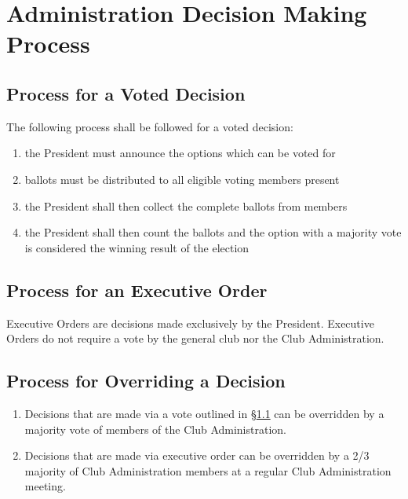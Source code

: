 \documentclass[english,11pt]{article}
\begin{document}
\section{Administration Decision Making Process} \label{art:decision-making}

\subsection{Process for a Voted Decision} \label{sect:decision-making:voted}
The following process shall be followed for a voted decision:

\begin{enumerate}[label=\alph*.]
    \item the President must announce the options which can be voted for
    \item ballots must be distributed to all eligible voting members present
    \item the President shall then collect the complete ballots from members
    \item the President shall then count the ballots and the option with a majority vote is considered the winning result of the election
\end{enumerate}

\subsection{Process for an Executive Order} \label{sect:decision-making:executive-order}
Executive Orders are decisions made exclusively by the President.
Executive Orders do not require a vote by the general club nor the Club Administration.

\subsection{Process for Overriding a Decision} \label{sect:decision-making:override}
\begin{enumerate}[label=\Alph*.]
    \item Decisions that are made via a vote outlined in §\ref{sect:decision-making:voted} can be overridden by a majority vote of members of the Club Administration.
    \item Decisions that are made via executive order can be overridden by a 2/3 majority of Club Administration members at a regular Club Administration meeting.
\end{enumerate}
\end{document}
